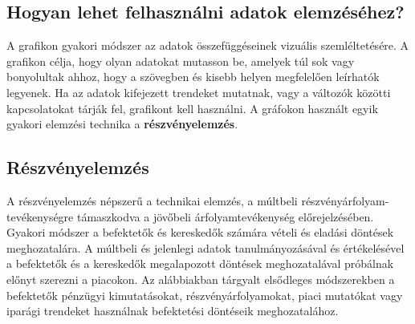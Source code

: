\subsection{Hogyan lehet felhasználni adatok elemzéséhez?}

A grafikon gyakori módszer az adatok összefüggéseinek vizuális szemléltetésére. A grafikon célja, hogy olyan adatokat mutasson be, amelyek túl sok vagy bonyolultak ahhoz, hogy a szövegben és kisebb helyen megfelelően leírhatók legyenek. Ha az adatok kifejezett trendeket mutatnak, vagy a változók közötti kapcsolatokat tárják fel, grafikont kell használni. 
A gráfokon használt egyik gyakori elemzési technika a \textbf{részvényelemzés}.

\subsection{Részvényelemzés}

A részvényelemzés népszerű a technikai elemzés, a múltbeli részvényárfolyam-
tevékenységre támaszkodva a jövőbeli árfolyamtevékenység előrejelzésében. Gyakori módszer a befektetők és kereskedők számára vételi és eladási döntések meghozatalára. A múltbeli és jelenlegi adatok tanulmányozásával és értékelésével a befektetők és a kereskedők megalapozott döntések meghozatalával próbálnak előnyt szerezni a piacokon. Az alábbiakban tárgyalt elsődleges módszerekben a befektetők pénzügyi kimutatásokat, részvényárfolyamokat, piaci mutatókat vagy iparági trendeket használnak befektetési döntéseik meghozatalához. \cite{investo}
